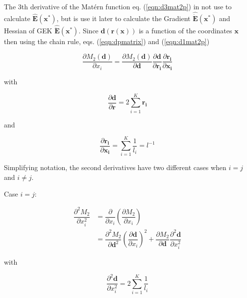 \documentclass[aps,prb,twocolumn,superscriptaddress,floatfix,longbibliography,10pt]{revtex4-2}
\begin{document}
The 3th derivative of the Mat\'ern function eq. (\ref{eqn:d3mat2p}) in not use to calculate $\mathbf{\hat{E}}(\mathbf{x}^*)$, but is use it later to calculate the Gradient $\mathbf{\hat{\dot{E}}}(\mathbf{x}^*)$ and Hessian of GEK $\mathbf{\hat{\ddot{E}}}(\mathbf{x}^*)$. Since $\mathbf{d(r(x))}$ is a function of the coordinates $\mathbf{x}$ then using the chain rule, eqs. (\ref{eqn:dpmatrix}) and (\ref{eqn:d1mat2p})

\begin{equation} \label{eqn:CRmat2pd1}
\dfrac{\partial M_2(\mathbf{d})}{\partial x_i} = \dfrac{\partial M_2(\mathbf{d})}{\partial\mathbf{d}} \dfrac{\partial\mathbf{d}}{\partial \mathbf{r_i}} \dfrac{\partial\mathbf{r_i}}{\partial \mathbf{x_i}}
\end{equation}

with

\begin{equation} \label{eqn:ddr}
\dfrac{\partial\mathbf{d}}{\partial \mathbf{r}} = 2\sum^K_{i=1}\mathbf{r_i}
\end{equation}

and

\begin{equation} \label{eqn:drdx}
\dfrac{\partial\mathbf{r_i}}{\partial \mathbf{x_i}} = \sum^K_{i=1}\dfrac{1}{l_i} = l^{-1}
\end{equation}

Simplifying notation, the second derivatives have two different cases when $i = j$ and $i \ne j$.

\vspace{2mm}

Case $i = j$:

\begin{equation} \label{eqn:Cmatd2}
\begin{split}
\dfrac{\partial^2 M_2}{\partial x_i^2} & = \dfrac{\partial}{\partial x_i} \left(\dfrac{\partial M_2}{\partial x_i}\right) \\
& = \dfrac{\partial^2 M_2}{\partial\mathbf{d}^2}\left(\dfrac{\partial\mathbf{d}}{\partial x_i}\right)^2 +  \dfrac{\partial M_2}{\partial\mathbf{d}}\dfrac{\partial^2\mathbf{d}}{\partial x_i^2}
\end{split}
\end{equation}

with

\begin{equation} \label{eqn:d2dr}
\dfrac{\partial^2\mathbf{d}}{\partial x_i^2} = 2\sum^K_{i=1}\frac{1}{l_i}
\end{equation}
\end{document}
